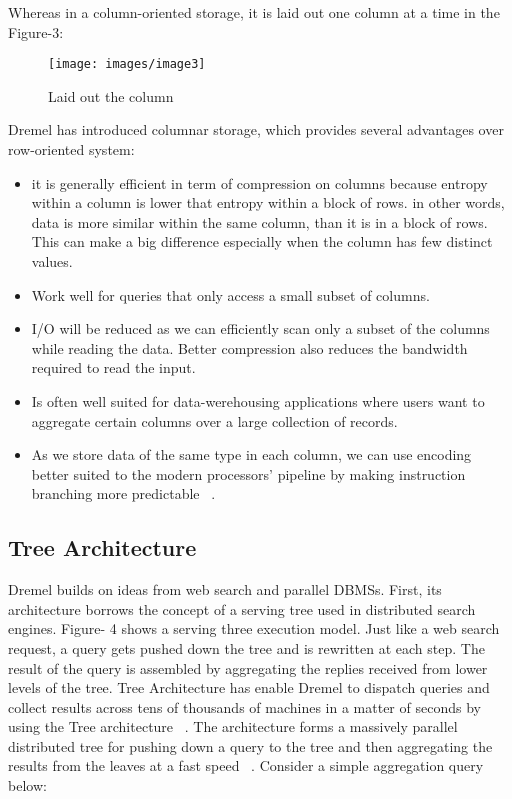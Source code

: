 \documentclass[9pt,twocolumn,twoside]{styles/osajnl}
\begin{document}
Whereas in a column-oriented storage, it is laid out one column at a time in the Figure-3:

\begin{figure}[H]
 \centering
\texttt{[image: images/image3]}
\caption{Laid out the column}
\end{figure}

Dremel has introduced columnar storage, which  provides several advantages over row-oriented system:

\begin{itemize}
  \item it is generally efficient in term of compression on columns because entropy within a column is lower that entropy within a block of rows. in other words, data is more similar within the same column, than it is in a block of rows. This can make a big difference especially when the column has few distinct values.
  \item Work well for queries that only access a small subset of columns. 
  \item I/O will be reduced as we can efficiently scan only a subset of the columns while reading the data. Better compression also reduces the bandwidth required to read the input.
  \item Is often well suited for data-werehousing applications where users want to aggregate certain columns over a large collection of records. 
  \item As we store data of the same type in each column, we can use encoding better suited to the modern processors’ pipeline by making instruction branching more predictable ~\cite{book-hadoop-apps}.
\end{itemize}


\subsection{Tree Architecture}
Dremel builds on ideas from web search and parallel DBMSs. First, its architecture borrows the concept of a serving tree used in distributed search engines. Figure- 4 shows a serving three execution model. Just like a web search request, a query gets pushed down the tree and is rewritten at each step. The result of the query is assembled by aggregating the replies received from lower levels of the tree. Tree Architecture has enable Dremel to dispatch queries and collect results across tens of thousands of machines in a matter of seconds by using the Tree architecture ~\cite{book2-hadoop}. The architecture forms a massively parallel distributed tree for pushing down a query to the tree and then aggregating the results from the leaves at a fast speed ~\cite{twitter-dremel}. Consider a simple aggregation query below:
\end{document}
